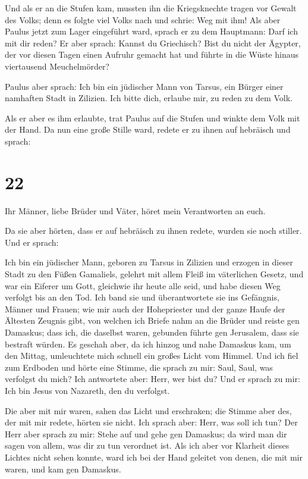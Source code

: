  Und als er an die Stufen kam, mussten ihn die
Kriegsknechte tragen vor Gewalt des Volks;  denn es
folgte viel Volks nach und schrie: Weg mit ihm!  Als aber
Paulus jetzt zum Lager eingeführt ward, sprach er zu dem Hauptmann: Darf
ich mit dir reden? Er aber sprach: Kannst du Griechisch? 
Bist du nicht der Ägypter, der vor diesen Tagen einen Aufruhr gemacht
hat und führte in die Wüste hinaus viertausend Meuchelmörder?

 Paulus aber sprach: Ich bin ein jüdischer Mann von
Tarsus, ein Bürger einer namhaften Stadt in Zilizien. Ich bitte dich,
erlaube mir, zu reden zu dem Volk.

 Als er aber es ihm erlaubte, trat Paulus auf die Stufen
und winkte dem Volk mit der Hand. Da nun eine große Stille ward, redete
er zu ihnen auf hebräisch und sprach:

\hypertarget{section-21}{%
\section{22}\label{section-21}}

 Ihr Männer, liebe Brüder und Väter, höret mein
Verantworten an euch.

 Da sie aber hörten, dass er auf hebräisch zu ihnen
redete, wurden sie noch stiller. Und er sprach:

 Ich bin ein jüdischer Mann, geboren zu Tarsus in Zilizien
und erzogen in dieser Stadt zu den Füßen Gamaliels, gelehrt mit allem
Fleiß im väterlichen Gesetz, und war ein Eiferer um Gott, gleichwie ihr
heute alle seid,  und habe diesen Weg verfolgt bis an den
Tod. Ich band sie und überantwortete sie ins Gefängnis, Männer und
Frauen;  wie mir auch der Hohepriester und der ganze Haufe
der Ältesten Zeugnis gibt, von welchen ich Briefe nahm an die Brüder und
reiste gen Damaskus; dass ich, die daselbst waren, gebunden führte gen
Jerusalem, dass sie bestraft würden.  Es geschah aber, da
ich hinzog und nahe Damaskus kam, um den Mittag, umleuchtete mich
schnell ein großes Licht vom Himmel.  Und ich fiel zum
Erdboden und hörte eine Stimme, die sprach zu mir: Saul, Saul, was
verfolgst du mich?  Ich antwortete aber: Herr, wer bist
du? Und er sprach zu mir: Ich bin Jesus von Nazareth, den du verfolgst.

 Die aber mit mir waren, sahen das Licht und erschraken;
die Stimme aber des, der mit mir redete, hörten sie nicht.
 Ich sprach aber: Herr, was soll ich tun? Der Herr aber
sprach zu mir: Stehe auf und gehe gen Damaskus; da wird man dir sagen
von allem, was dir zu tun verordnet ist.  Als ich aber
vor Klarheit dieses Lichtes nicht sehen konnte, ward ich bei der Hand
geleitet von denen, die mit mir waren, und kam gen Damaskus.


